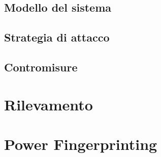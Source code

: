 \subsection{Modello del sistema}

\subsection{Strategia di attacco}

\subsection{Contromisure}

\section{Rilevamento}
\section{Power Fingerprinting}


